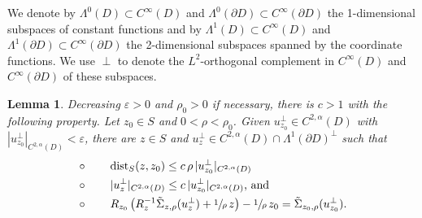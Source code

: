\documentclass[11pt]{amsart}
\newtheorem{lem}[prop]{Lemma}
\begin{document}
 We denote by $\Lambda^0(D)\subset C^\infty(D)$ and $\Lambda^0(\partial D)\subset C^\infty(\partial D)$ the 1-dimensional subspaces of constant functions and by $\Lambda^1(D)\subset C^\infty(D)$ and  $\Lambda^1(\partial D)\subset C^\infty(\partial D)$ the 2-dimensional subspaces spanned by the coordinate functions. 
  We use $\perp$ to denote the $L^2$-orthogonal complement in $C^\infty(D)$ and $C^\infty(\partial D)$ of these subspaces.
\begin{lem} \label{tangential correction}
Decreasing $\varepsilon>0$ and $\rho_0>0$ if necessary, there is $c>1$ with the following property.  Let $z_0\in S$ and  $0<\rho<\rho_0$. Given $u_{z_0}^\perp\in C^{2,\alpha}(D)$ with $|u_{z_0}^\perp|_{C^{2,\alpha}(D)}<\varepsilon$, there are $z\in S$ and  $u_z^\perp \in C^{2,\alpha}(D)\cap \Lambda^{1}(\partial D)^\perp$ such that 
\begin{align*}
	&\circ\qquad\text{$\operatorname{dist}_S(z,z_0)\leq c\,\rho\,|u_{z_0}^\perp|_{C^{2,\alpha}(D)}$}\\
	&\circ\qquad\text{$|u_z^\perp|_{C^{2,\alpha}(D)}\leq c\,|u_{z_0}^\perp|_{C^{2,\alpha}(D)}$, and}\\
	&\circ\qquad\text{$R_{z_0}\left(R_z^{-1}\tilde \Sigma_{z,\rho}( u_z^\perp)+\sfrac1\rho\,z\right)-\sfrac1\rho\,z_0=\tilde \Sigma_{z_0,\rho}(u_{z_0}^\perp).$}
\end{align*}
\end{lem}
\end{document}
